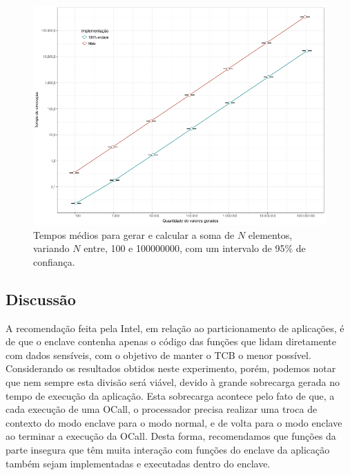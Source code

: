 \begin{figure}[ht]
    \centering
    \includegraphics[width=5in]{img/particionamento-aplicacoes-final}
    \caption{Tempos médios para gerar e calcular a soma de $N$ elementos,
    variando $N$ entre, 100 e 100000000, com um intervalo de 95\% de confiança.}
    \label{fig:abordagem_particionamento_aplicacoes}
\end{figure}

\subsection*{Discussão}

A recomendação feita pela Intel, em relação ao particionamento de aplicações, é
de que o enclave contenha apenas o código das funções que lidam diretamente com
dados sensíveis, com o objetivo de manter o TCB o menor possível. Considerando
os resultados obtidos neste experimento, porém, podemos notar que nem sempre
esta divisão será viável, devido à grande sobrecarga gerada no tempo de execução
da aplicação. Esta sobrecarga acontece pelo fato de que, a cada execução de uma
OCall, o processador precisa realizar uma troca de contexto do modo enclave para
o modo normal, e de volta para o modo enclave ao terminar a execução da OCall.
Desta forma, recomendamos que funções da parte insegura que têm muita interação
com funções do enclave da aplicação também sejam implementadas e executadas
dentro do enclave.


